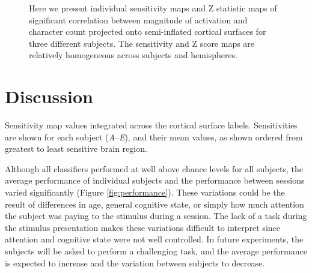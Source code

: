 \documentclass[5p,authoryear]{elsarticle}
\begin{document}
\begin{figure}
\small{}
\caption{Here we present individual sensitivity maps and Z statistic maps of significant correlation between magnitude of activation and character count projected onto semi-inflated cortical surfaces for three different subjects.
The sensitivity and Z score maps are relatively homogeneous across subjects and hemispheres.}
\label{fig:individual-sensitivity}
\end{figure}

\section{Discussion}

\begin{table}
\centering

\caption{Sensitivity map values integrated across the cortical surface labels. Sensitivities are shown for each subject (\emph{A}--\emph{E}), and their mean values, as shown ordered from greatest to least sensitive brain region.}
\label{tab:full-sensitivity}
\end{table}

Although all classifiers performed at well above chance levels for all subjects, the average performance of individual subjects and the performance between sessions varied significantly (Figure \ref{fig:performance}).
These variations could be the result of differences in age, general cognitive state, or simply how much attention the subject was paying to the stimulus during a session.
The lack of a task during the stimulus presentation makes these variations difficult to interpret since attention and cognitive state were not well controlled.
In future experiments, the subjects will be asked to perform a challenging task, and the average performance is expected to increase and the variation between subjects to decrease.
\end{document}
